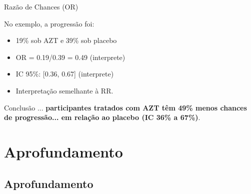 \documentclass{beamer}
\begin{document}
\begin{frame}{Razão de Chances (OR)}
  \begin{exampleblock}{No exemplo, a progressão foi:}
    \begin{itemize}
    \item 19\% sob AZT e 39\% sob placebo
    \item OR = 0.19/0.39 = 0.49 (interprete)
    \item IC 95\%: [0.36, 0.67] (interprete)
    \end{itemize}
  \end{exampleblock}
  \begin{itemize}
  \item Interpretação semelhante à RR.
  \end{itemize}
  \begin{exampleblock}{Conclusão}
    ... {\bf participantes tratados com AZT têm 49\% menos chances de progressão... em relação ao placebo (IC 36\% a 67\%)}.
  \end{exampleblock}
\end{frame}

\section{Aprofundamento}

\subsection{Aprofundamento}
\end{document}
